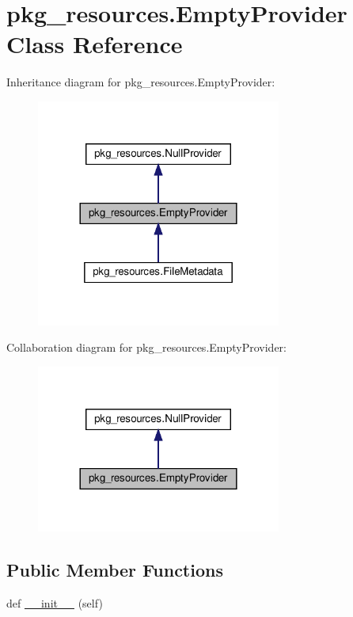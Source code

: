 \hypertarget{classpkg__resources_1_1EmptyProvider}{}\section{pkg\+\_\+resources.\+Empty\+Provider Class Reference}
\label{classpkg__resources_1_1EmptyProvider}


Inheritance diagram for pkg\+\_\+resources.\+Empty\+Provider\+:
\nopagebreak
\begin{figure}[H]
\begin{center}
\leavevmode
\includegraphics[width=228pt]{classpkg__resources_1_1EmptyProvider__inherit__graph}
\end{center}
\end{figure}


Collaboration diagram for pkg\+\_\+resources.\+Empty\+Provider\+:
\nopagebreak
\begin{figure}[H]
\begin{center}
\leavevmode
\includegraphics[width=228pt]{classpkg__resources_1_1EmptyProvider__coll__graph}
\end{center}
\end{figure}
\subsection*{Public Member Functions}
\begin{DoxyCompactItemize}
\item 
def \hyperlink{classpkg__resources_1_1EmptyProvider_a20ef7e9649edf4800dc02dbd50b5d410}{\+\_\+\+\_\+init\+\_\+\+\_\+} (self)
\end{DoxyCompactItemize}
